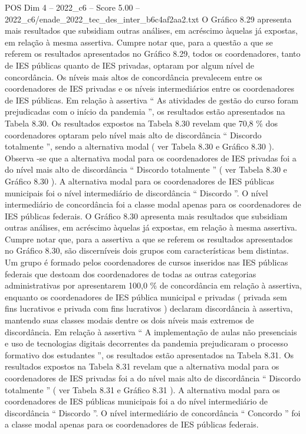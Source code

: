 \begin{textsample}{POS Dim 4 – 2022\_c6 – Score 5.00 – 2022\_c6/enade\_2022\_tec\_des\_inter\_b6c4af2aa2.txt}
O Gráfico 8.29 apresenta mais resultados que subsidiam outras análises, em acréscimo àquelas já expostas, em relação à mesma assertiva.
Cumpre notar que, para a questão a que se referem os resultados apresentados no Gráfico 8.29, todos os coordenadores, tanto de IES públicas quanto de IES privadas, optaram por algum nível de concordância.
Os níveis mais altos de concordância prevalecem entre os coordenadores de IES privadas e os níveis intermediários entre os coordenadores de IES públicas.
Em relação à assertiva “ As atividades de gestão do curso foram prejudicadas com o início da pandemia ”, os resultados estão apresentados na Tabela 8.30.
Os resultados expostos na Tabela 8.30 revelam que 70,8 \% dos coordenadores optaram pelo nível mais alto de discordância “ Discordo totalmente ”, sendo a alternativa modal ( ver Tabela 8.30 e Gráfico 8.30 ).
Observa -se que a alternativa modal para os coordenadores de IES privadas foi a do nível mais alto de discordância “ Discordo totalmente ” ( ver Tabela 8.30 e Gráfico 8.30 ).
A alternativa modal para os coordenadores de IES públicas municipais foi o nível intermediário de discordância “ Discordo ”.
O nível intermediário de concordância foi a classe modal apenas para os coordenadores de IES públicas federais.
O Gráfico 8.30 apresenta mais resultados que subsidiam outras análises, em acréscimo àquelas já expostas, em relação à mesma assertiva.
Cumpre notar que, para a assertiva a que se referem os resultados apresentados no Gráfico 8.30, são discerníveis dois grupos com características bem distintas.
Um grupo é formado pelos coordenadores de cursos inseridos nas IES públicas federais que destoam dos coordenadores de todas as outras categorias administrativas por apresentarem 100,0 \% de concordância em relação à assertiva, enquanto os coordenadores de IES pública municipal e privadas ( privada sem fins lucrativos e privada com fins lucrativos ) declaram discordância à assertiva, mantendo suas classes modais dentre os dois níveis mais extremos de discordância.
Em relação à assertiva “ A implementação de aulas não presenciais e uso de tecnologias digitais decorrentes da pandemia prejudicaram o processo formativo dos estudantes ”, os resultados estão apresentados na Tabela 8.31.
Os resultados expostos na Tabela 8.31 revelam que a alternativa modal para os coordenadores de IES privadas foi a do nível mais alto de discordância “ Discordo totalmente ” ( ver Tabela 8.31 e Gráfico 8.31 ).
A alternativa modal para os coordenadores de IES públicas municipais foi a do nível intermediário de discordância “ Discordo ”.
O nível intermediário de concordância “ Concordo ” foi a classe modal apenas para os coordenadores de IES públicas federais.

\end{textsample}
